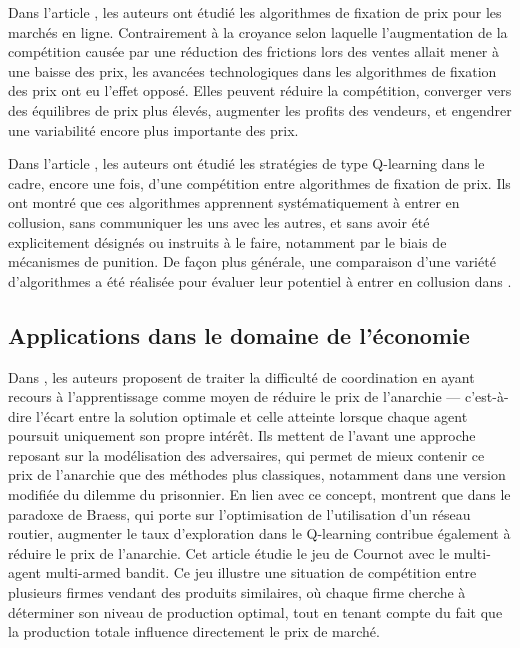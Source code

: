 \documentclass{article}
\theoremstyle{definition}
\begin{document}
Dans l'article \citet{brown_competition_2023}, les auteurs ont étudié les algorithmes de fixation de prix pour les marchés en ligne. Contrairement à la croyance selon laquelle l'augmentation de la compétition causée par une réduction des frictions lors des ventes allait mener à une baisse des prix, les avancées technologiques dans les algorithmes de fixation des prix ont eu l'effet opposé. Elles peuvent réduire la compétition, converger vers des équilibres de prix plus élevés, augmenter les profits des vendeurs, et engendrer une variabilité encore plus importante des prix.

Dans l'article \citet{calvano_artificial_2020}, les auteurs ont étudié les stratégies de type Q-learning dans le cadre, encore une fois, d’une compétition entre algorithmes de fixation de prix. Ils ont montré que ces algorithmes apprennent systématiquement à entrer en collusion, sans communiquer les uns avec les autres, et sans avoir été explicitement désignés ou instruits à le faire, notamment par le biais de mécanismes de punition. De façon plus générale, une comparaison d’une variété d’algorithmes a été réalisée pour évaluer leur potentiel à entrer en collusion dans
\citet{sadoune_algorithmic_2024}.


\subsection{Applications dans le domaine de l'économie}

Dans \citet{balduzzi_open-ended_nodate}, les auteurs proposent de traiter la difficulté de coordination en ayant recours à l'apprentissage comme moyen de réduire le prix de l'anarchie — c’est-à-dire l’écart entre la solution optimale et celle atteinte lorsque chaque agent poursuit uniquement son propre intérêt. Ils mettent de l’avant une approche reposant sur la modélisation des adversaires, qui permet de mieux contenir ce prix de l’anarchie que des méthodes plus classiques, notamment dans une version modifiée du dilemme du prisonnier.
En lien avec ce concept, \citet{carissimo_social_2023} montrent que dans le paradoxe de Braess, qui porte sur l’optimisation de l'utilisation d'un réseau routier, augmenter le taux d’exploration dans le Q-learning contribue également à réduire le prix de l’anarchie.
Cet article \citet{taywade_modelling_2022} étudie le jeu de Cournot avec le multi-agent multi-armed bandit. Ce jeu illustre une situation de compétition entre plusieurs firmes vendant des produits similaires, où chaque firme cherche à déterminer son niveau de production optimal, tout en tenant compte du fait que la production totale influence directement le prix de marché.
\end{document}
